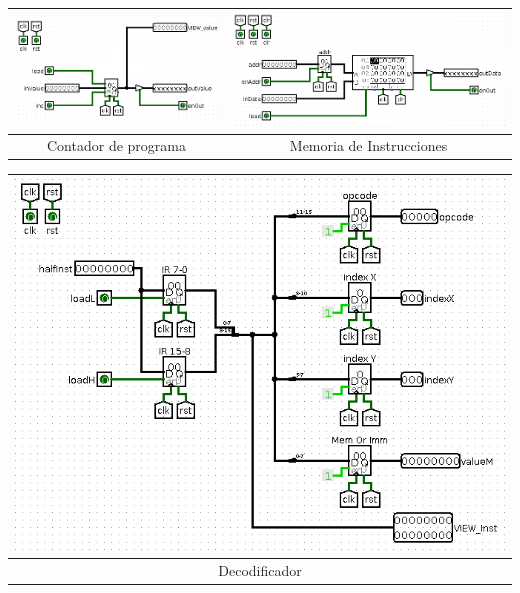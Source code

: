 \documentclass[a4paper,11pt]{article}
\begin{document}
\vspace{0.5cm}

\begin{center}
\begin{tabular}[t]{c|c}
\includegraphics[scale=0.3]{img/2_PC.png} & \includegraphics[scale=0.3]{img/5_Memory.png}\\
\hline
Contador de programa & Memoria de Instrucciones\\ \hline
\end{tabular}
\end{center}

\vspace{0.5cm}

\begin{center}
\begin{tabular}[t]{c}
\includegraphics[scale=0.3]{img/6_Decode.png}\\
\hline
Decodificador\\ \hline
\end{tabular}
\end{center}
\end{document}
